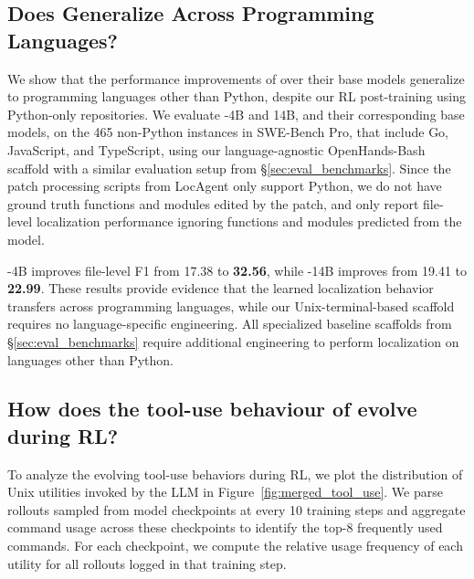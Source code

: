 \subsection{Does \methodname Generalize Across Programming Languages?}\label{sec:cross_language}
We show that the performance improvements of \methodname over their base models generalize to programming languages other than Python, despite our RL post-training using Python-only repositories. We evaluate \methodname-4B and 14B, and their corresponding base models, on the 465 non-Python instances in SWE-Bench Pro, that include Go, JavaScript, and TypeScript,  using our language-agnostic OpenHands-Bash scaffold with a similar evaluation setup from \S\ref{sec:eval_benchmarks}. Since the patch processing scripts from LocAgent \citep{chen-etal-2025-locagent} only support Python, we do not have ground truth functions and modules edited by the patch, and only report file-level localization performance ignoring functions and modules predicted from the model. 

\methodname-4B improves file-level F1 from 17.38 to \textbf{32.56}, while \methodname-14B improves from 19.41 to \textbf{22.99}. These results provide evidence that the learned localization behavior transfers across programming languages, while our Unix-terminal-based scaffold requires no language-specific engineering. All specialized baseline scaffolds from \S\ref{sec:eval_benchmarks} require additional engineering to perform localization on languages other than Python.

\subsection{How does the tool-use behaviour of \methodname evolve during RL?}\label{sec:tool_use_behaviour}
To analyze the evolving tool-use behaviors during RL, we plot the distribution of Unix utilities invoked by the LLM in Figure~\ref{fig:merged_tool_use}. We parse rollouts sampled from model checkpoints at every 10 training steps and aggregate command usage across these checkpoints to identify the top-8 frequently used commands. For each checkpoint, we compute the relative usage frequency of each utility for all rollouts logged in that training step.

